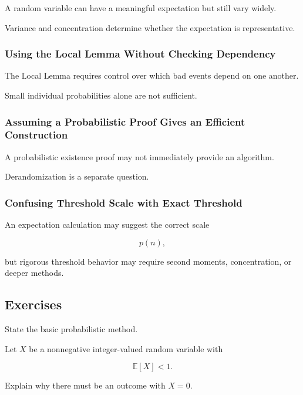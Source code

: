 A random variable can have a meaningful expectation but still vary
widely.

Variance and concentration determine whether the expectation is
representative.

\subsubsection{Using the Local Lemma Without Checking Dependency}

The Local Lemma requires control over which bad events depend on one
another.

Small individual probabilities alone are not sufficient.

\subsubsection{Assuming a Probabilistic Proof Gives an Efficient Construction}

A probabilistic existence proof may not immediately provide an
algorithm.

Derandomization is a separate question.

\subsubsection{Confusing Threshold Scale with Exact Threshold}

An expectation calculation may suggest the correct scale

\[
p(n),
\]

but rigorous threshold behavior may require second moments,
concentration, or deeper methods.

\subsection{Exercises}
\label{subsec:probabilistic-combinatorics-exercises}

\begin{exercise}[1]
State the basic probabilistic method.
\end{exercise}

\begin{exercise}[1]
Let \(X\) be a nonnegative integer-valued random variable with

\[
\mathbb{E}[X]<1.
\]

Explain why there must be an outcome with \(X=0\).
\end{exercise}


